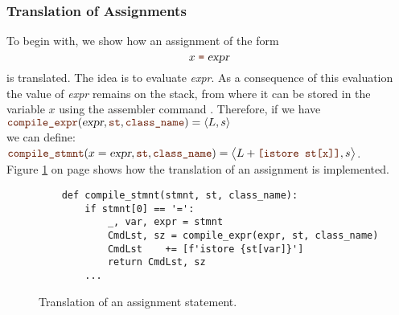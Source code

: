 \subsubsection{Translation of Assignments}
To begin with, we show how an assignment of the form 
\[ x \;\mytt{=}\; \textsl{expr} \]
is translated.  The idea is to evaluate \textsl{expr}.  As a consequence of this evaluation  the value of
\textsl{expr} remains on the stack, from where it can be stored in the variable $x$ using the assembler command 
. Therefore, if we have
\\[0.2cm]
\hspace*{1.3cm}
$\mytt{compile\_expr}(\textsl{expr}, \mytt{st}, \mytt{class\_name}) = \pair(L, s)$
\\[0.2cm]
we can define:
\\[0.2cm]
\hspace*{1.3cm}
$\mytt{compile\_stmnt}(x = \textsl{expr}, \mytt{st}, \mytt{class\_name})
= \bigl\langle L + \mytt{[istore st[x]]}, s \bigr\rangle $.
\\[0.2cm]
Figure \ref{fig:Compiler.ipynb:compile:assign} on page \pageref{fig:Compiler.ipynb:compile:assign} shows how the
translation of an assignment is implemented.


\begin{figure}[!ht]
\centering
\begin{verbatim}
    def compile_stmnt(stmnt, st, class_name):
        if stmnt[0] == '=':
            _, var, expr = stmnt
            CmdLst, sz = compile_expr(expr, st, class_name)
            CmdLst    += [f'istore {st[var]}']
            return CmdLst, sz                
        ...
\end{verbatim}
\vspace*{-0.3cm}
\caption{Translation of an assignment statement.}
\label{fig:Compiler.ipynb:compile:assign}
\end{figure}




